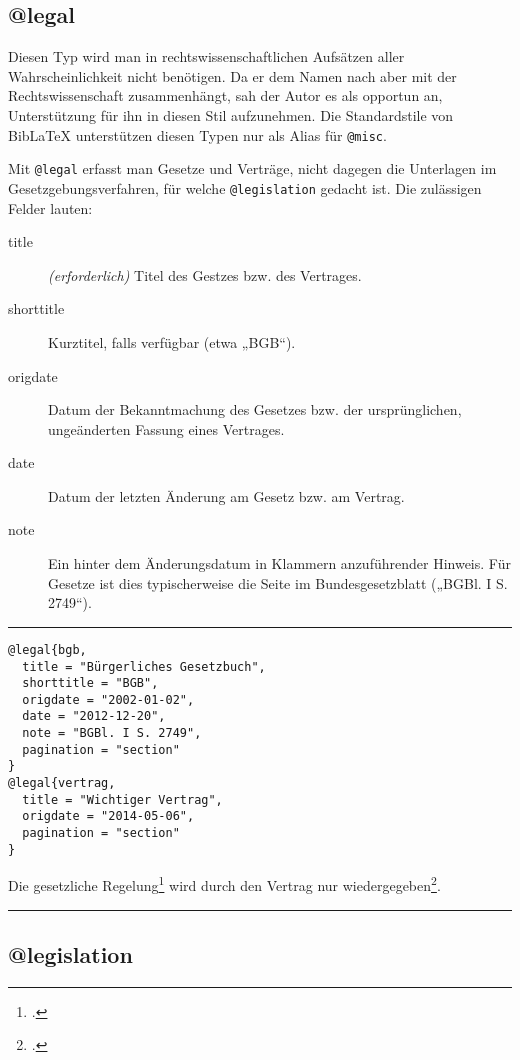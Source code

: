 \documentclass[11pt,a4paper,DIV=calc]{scrartcl}
\newcommand\software[1]{\textsf{#1}}
\newcommand\Biblatex{\software{Bib\LaTeX{}}\xspace}
\newenvironment{rubexample}{\par\vspace{\baselineskip}\hrule\par\begin{refsection}}{\end{refsection}\par\hrule\par\vspace{\baselineskip}}
\begin{document}
\subsection{@legal}

Diesen Typ wird man in rechtswissenschaftlichen Aufsätzen aller
Wahrscheinlichkeit nicht benötigen. Da er dem Namen nach aber mit der
Rechtswissenschaft zusammenhängt, sah der Autor es als opportun an,
Unterstützung für ihn in diesen Stil aufzunehmen. Die Standardstile
von \Biblatex unterstützen diesen Typen nur als Alias für \verb+@misc+.

Mit \verb+@legal+ erfasst man Gesetze und Verträge, nicht dagegen die
Unterlagen im Gesetzgebungsverfahren, für welche \verb+@legislation+
gedacht ist. Die zulässigen Felder lauten:

\begin{description}
\item[title] \emph{(erforderlich)} Titel des Gestzes bzw. des
  Vertrages.
\item[shorttitle] Kurztitel, falls verfügbar (etwa „BGB“).
\item[origdate] Datum der Bekanntmachung des Gesetzes bzw. der
  ursprünglichen, ungeänderten Fassung eines Vertrages.
\item[date] Datum der letzten Änderung am Gesetz bzw. am Vertrag.
\item[note] Ein hinter dem Änderungsdatum in Klammern anzuführender
  Hinweis. Für Gesetze ist dies typischerweise die Seite im
  Bundesgesetzblatt („BGBl. I S. 2749“).
\end{description}

\begin{rubexample}
\begin{verbatim}
@legal{bgb,
  title = "Bürgerliches Gesetzbuch",
  shorttitle = "BGB",
  origdate = "2002-01-02",
  date = "2012-12-20",
  note = "BGBl. I S. 2749",
  pagination = "section"
}
@legal{vertrag,
  title = "Wichtiger Vertrag",
  origdate = "2014-05-06",
  pagination = "section"
}
\end{verbatim}

Die gesetzliche Regelung\footcite[582]{bgb} wird durch den Vertrag nur
wiedergegeben\footcite[11]{vertrag}.

\printbibliography
\end{rubexample}

\subsection{@legislation}
\end{document}
